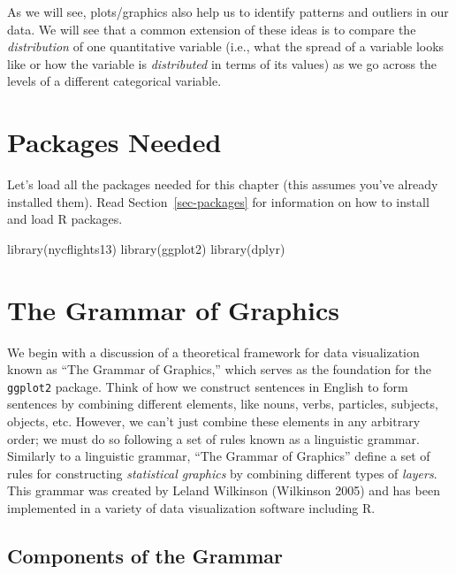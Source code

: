 \documentclass[
  letterpaper,
  DIV=11,
  numbers=noendperiod]{scrreprt}
\newenvironment{Shaded}{\begin{snugshade}}{\end{snugshade}}
\newcommand{\FunctionTok}[1]{\textcolor[rgb]{0.28,0.35,0.67}{#1}}
\newcommand{\NormalTok}[1]{\textcolor[rgb]{0.00,0.23,0.31}{#1}}
\theoremstyle{definition}
\theoremstyle{remark}
\begin{document}
As we will see, plots/graphics also help us to identify patterns and
outliers in our data. We will see that a common extension of these ideas
is to compare the \emph{distribution} of one quantitative variable
(i.e., what the spread of a variable looks like or how the variable is
\emph{distributed} in terms of its values) as we go across the levels of
a different categorical variable.

\hypertarget{packages-needed}{%
\section*{Packages Needed}\label{packages-needed}}


Let's load all the packages needed for this chapter (this assumes you've
already installed them). Read Section~\ref{sec-packages} for information
on how to install and load R packages.

\begin{Shaded}
\begin{Highlighting}[]
\FunctionTok{library}\NormalTok{(nycflights13)}
\FunctionTok{library}\NormalTok{(ggplot2)}
\FunctionTok{library}\NormalTok{(dplyr)}
\end{Highlighting}
\end{Shaded}

\hypertarget{sec-grammarofgraphics}{%
\section{The Grammar of Graphics}\label{sec-grammarofgraphics}}

We begin with a discussion of a theoretical framework for data
visualization known as ``The Grammar of Graphics,'' which serves as the
foundation for the \texttt{ggplot2} package. Think of how we construct
sentences in English to form sentences by combining different elements,
like nouns, verbs, particles, subjects, objects, etc. However, we can't
just combine these elements in any arbitrary order; we must do so
following a set of rules known as a linguistic grammar. Similarly to a
linguistic grammar, ``The Grammar of Graphics'' define a set of rules
for constructing \emph{statistical graphics} by combining different
types of \emph{layers}. This grammar was created by Leland Wilkinson
(Wilkinson 2005) and has been implemented in a variety of data
visualization software including R.

\hypertarget{components-of-the-grammar}{%
\subsection{Components of the Grammar}\label{components-of-the-grammar}}
\end{document}

